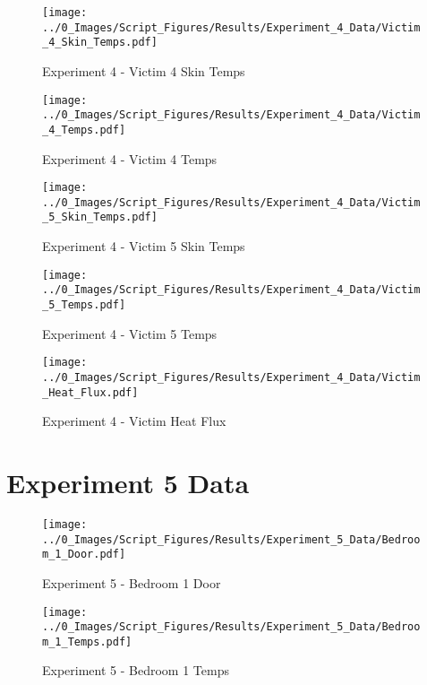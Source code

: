 	\clearpage

	\begin{figure}[H]
		\centering
		\texttt{[image: ../0\_Images/Script\_Figures/Results/Experiment\_4\_Data/Victim\_4\_Skin\_Temps.pdf]}
		\caption[]{Experiment 4 - Victim 4 Skin Temps}
	\end{figure}
 

	\begin{figure}[H]
		\centering
		\texttt{[image: ../0\_Images/Script\_Figures/Results/Experiment\_4\_Data/Victim\_4\_Temps.pdf]}
		\caption[]{Experiment 4 - Victim 4 Temps}
	\end{figure}
 
	\clearpage

	\begin{figure}[H]
		\centering
		\texttt{[image: ../0\_Images/Script\_Figures/Results/Experiment\_4\_Data/Victim\_5\_Skin\_Temps.pdf]}
		\caption[]{Experiment 4 - Victim 5 Skin Temps}
	\end{figure}
 

	\begin{figure}[H]
		\centering
		\texttt{[image: ../0\_Images/Script\_Figures/Results/Experiment\_4\_Data/Victim\_5\_Temps.pdf]}
		\caption[]{Experiment 4 - Victim 5 Temps}
	\end{figure}
 
	\clearpage

	\begin{figure}[H]
		\centering
		\texttt{[image: ../0\_Images/Script\_Figures/Results/Experiment\_4\_Data/Victim\_Heat\_Flux.pdf]}
		\caption[]{Experiment 4 - Victim Heat Flux}
	\end{figure}
 

\clearpage		\large
\section{Experiment 5 Data} \label{App:Exp5Results} 

	\begin{figure}[H]
		\centering
		\texttt{[image: ../0\_Images/Script\_Figures/Results/Experiment\_5\_Data/Bedroom\_1\_Door.pdf]}
		\caption[]{Experiment 5 - Bedroom 1 Door}
	\end{figure}
 

	\begin{figure}[H]
		\centering
		\texttt{[image: ../0\_Images/Script\_Figures/Results/Experiment\_5\_Data/Bedroom\_1\_Temps.pdf]}
		\caption[]{Experiment 5 - Bedroom 1 Temps}
	\end{figure}
 
